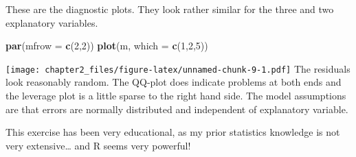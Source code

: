 \documentclass[
]{article}
\newenvironment{Shaded}{\begin{snugshade}}{\end{snugshade}}
\newcommand{\DataTypeTok}[1]{\textcolor[rgb]{0.13,0.29,0.53}{#1}}
\newcommand{\DecValTok}[1]{\textcolor[rgb]{0.00,0.00,0.81}{#1}}
\newcommand{\KeywordTok}[1]{\textcolor[rgb]{0.13,0.29,0.53}{\textbf{#1}}}
\newcommand{\NormalTok}[1]{#1}
\begin{document}
These are the diagnostic plots. They look rather similar for the three
and two explanatory variables.

\begin{Shaded}
\begin{Highlighting}[]
\KeywordTok{par}\NormalTok{(}\DataTypeTok{mfrow =} \KeywordTok{c}\NormalTok{(}\DecValTok{2}\NormalTok{,}\DecValTok{2}\NormalTok{))}
\KeywordTok{plot}\NormalTok{(m, }\DataTypeTok{which =} \KeywordTok{c}\NormalTok{(}\DecValTok{1}\NormalTok{,}\DecValTok{2}\NormalTok{,}\DecValTok{5}\NormalTok{))}
\end{Highlighting}
\end{Shaded}

\texttt{[image: chapter2\_files/figure-latex/unnamed-chunk-9-1.pdf]} The
residuals look reasonably random. The QQ-plot does indicate problems at
both ends and the leverage plot is a little sparse to the right hand
side. The model assumptions are that errors are normally distributed and
independent of explanatory variable.

This exercise has been very educational, as my prior statistics
knowledge is not very extensive\ldots{} and R seems very powerful!
\end{document}
